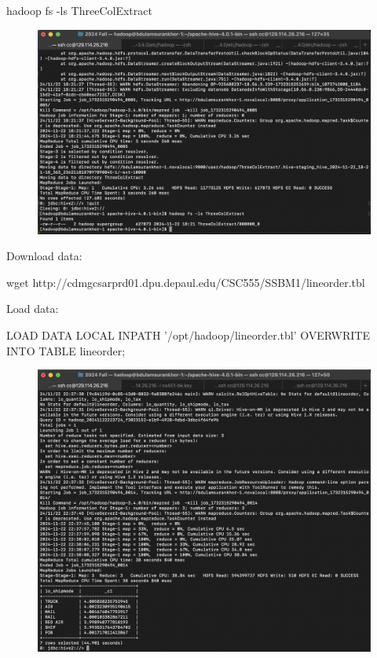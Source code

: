 \documentclass{article}
\begin{document}
hadoop fs -ls ThreeColExtract

\begin{figure}[H]
  \centering
  \includegraphics[width=\textwidth]{image12.png}
\end{figure}

Download data:

wget http://cdmgcsarprd01.dpu.depaul.edu/CSC555/SSBM1/lineorder.tbl

Load data:

LOAD DATA LOCAL INPATH '/opt/hadoop/lineorder.tbl' OVERWRITE INTO TABLE lineorder;

\begin{figure}[H]
  \centering
  \includegraphics[width=\textwidth]{image13.png}
\end{figure}
\end{document}
